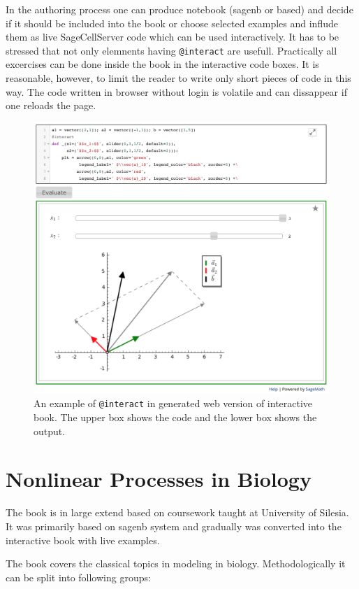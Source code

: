 \documentclass{deliverablereport}
\begin{document}
In the authoring process one can produce notebook (sagenb or \Jupyter
based) and decide if it should be included into the \Sphinx book or
choose selected examples and influde them as live SageCellServer code
which can be used interactively. It has to be stressed that not only
elemnents having \texttt{@interact} are usefull. Practically all 
excercises can be done inside the book in the interactive code
boxes. It is reasonable, however, to limit the reader to write only
short pieces of code in this way.  The code written in browser without
login is volatile and can dissappear if one reloads the page.

\begin{figure}
\centerline{\includegraphics[width=.7\textwidth]{interact_in_sphinx.png}}
\caption{\label{fig:interact_sphinx} An example of \texttt{@interact} in
  \Sphinx generated web version of interactive book. The upper box
  shows the code and the lower box shows the output.}
\end{figure}


\section{ Nonlinear Processes in Biology }

The book is in large extend based on coursework taught at University
of Silesia. It was primarily based on sagenb system and gradually was
converted into the interactive book with live examples.


The book covers the classical topics in modeling in
biology. Methodologically it can be split into following groups:
\end{document}
